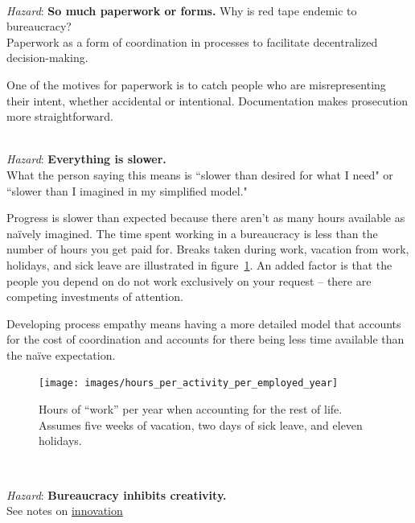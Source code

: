 \ \\
\textit{Hazard}: \textbf{So much paperwork or forms.}
Why is red tape endemic to bureaucracy?\\
Paperwork as a form of coordination in processes to facilitate decentralized decision-making. 

One of the motives for paperwork is to catch people who are misrepresenting their intent, whether accidental or intentional. Documentation makes prosecution more straightforward.

\ \\
\textit{Hazard}: \textbf{Everything is slower.}\\
What the person saying this means is ``slower than desired for what I need" or ``slower than I imagined in my simplified model."

Progress is slower than expected because there aren't as many hours available as na\"ively imagined. The  time spent working in a bureaucracy is less than the number of hours you get paid for. Breaks taken during work, vacation from work, holidays, and sick leave are illustrated in figure~\ref{fig:hours_per_year}. An added factor is that the people you depend on do not work exclusively on your request -- there are competing investments of attention. 

Developing \gls{process empathy} means having a more detailed model that accounts for the cost of coordination and accounts for there being less time available than the na\"ive expectation. 


\begin{figure}[!htb] %
    \centering
    \texttt{[image: images/hours\_per\_activity\_per\_employed\_year]}
    \caption{Hours of ``work'' per year when accounting for the rest of life. Assumes five weeks of vacation, two days of sick leave, and eleven holidays.}
    \label{fig:hours_per_year}
\end{figure}

\ \\
\begin{samepage}
\textit{Hazard}: \textbf{Bureaucracy inhibits creativity.}\\
See 
notes on 
\hyperref[sec:innovation]{innovation}\iftoggle{haspagenumbers}{ on page~\pageref{sec:innovation}.}{.}
\end{samepage}


